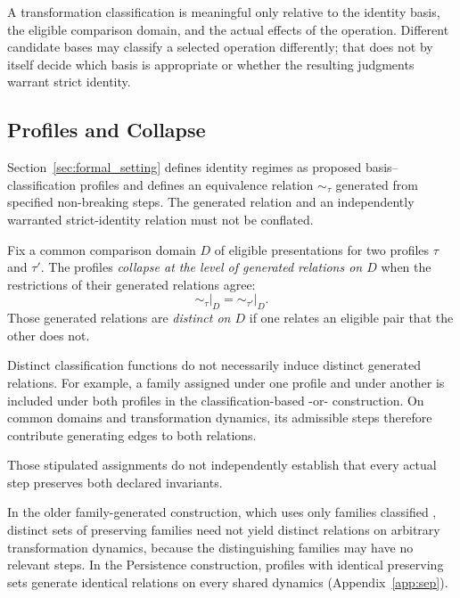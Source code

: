 A transformation classification is meaningful only relative to the
identity basis, the eligible comparison domain, and the actual effects
of the operation.
Different candidate bases may classify a selected
operation differently; that does not by itself decide which basis is
appropriate or whether the resulting judgments warrant strict identity.

\subsection{Profiles and Collapse}
\label{subsec:profiles_and_collapse}

Section~\ref{sec:formal_setting} defines identity regimes as proposed
basis--classification profiles and defines an equivalence relation
$\sim_\tau$ generated from specified non-breaking steps.
The generated relation and an independently warranted strict-identity
relation must not be conflated.

\begin{definition}[Collapse]
  \label{se200.def.Collapse}
  Fix a common comparison domain $D$ of eligible presentations for
  two profiles $\tau$ and $\tau'$.
  The profiles \emph{collapse at the level
    of generated relations on $D$} when the restrictions of their generated
  relations agree:
  \[
    {\sim_\tau}\big|_D = {\sim_{\tau'}}\big|_D.
  \]
  Those generated relations are \emph{distinct on $D$} if one relates
  an eligible pair that the other does not.
\end{definition}

Distinct classification functions do not necessarily induce distinct
generated relations.
For example, a family assigned \PRS{} under one profile and
\NEU{} under another is included under both profiles in
the classification-based \PRS{}-or-\NEU{} construction.
On common domains and transformation dynamics, its admissible
steps therefore contribute generating edges to both relations.

Those stipulated assignments do not independently establish
that every actual step preserves both declared invariants.

In the older family-generated construction, which uses only families
classified \PRS{}, distinct sets of preserving families need not yield
distinct relations on arbitrary transformation dynamics,
because the distinguishing families may have no relevant steps.
In the Persistence construction, profiles with identical preserving
sets generate identical relations on every shared dynamics
(Appendix~\ref{app:sep}).

